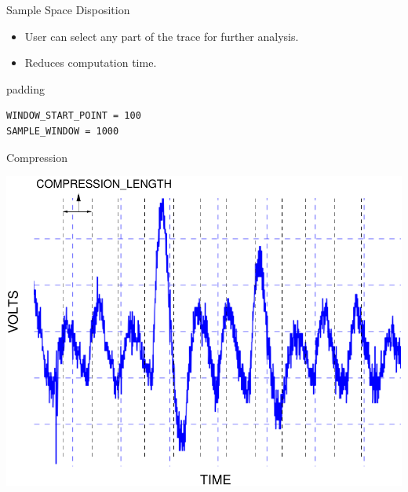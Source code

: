 \documentclass[final]{beamer}
\begin{document}
\begin{frame}[fragile]{}
\begin{columns}[t]
\begin{column}{.31\linewidth}
\begin{block}{Sample Space Disposition}
\begin{minipage}[t]{0.49\linewidth}
        \end{minipage}%
        \begin{minipage}[t]{0.49\linewidth}%
          \vspace{-8cm}%
          \begin{itemize}
            \item User can select any part of the trace for further analysis.
            \item Reduces computation time.
          \end{itemize} 
          \begin{center}
            \begin{beamercolorbox}[rounded=true]{padding}%
               \footnotesize%
              \begin{lstlisting}
WINDOW_START_POINT = 100
SAMPLE_WINDOW = 1000
              \end{lstlisting}
            \end{beamercolorbox}
          \end{center}
        \end{minipage}
       \end{block}
       \begin{block}{Compression}
        \begin{minipage}[t]{0.49\linewidth}
          \includegraphics[scale=0.7]{../figures/compression}
        \end{minipage}%
        \begin{minipage}[t]{0.49\linewidth}%

\end{minipage}
\end{block}
\end{column}
\end{columns}
\end{frame}
\end{document}
